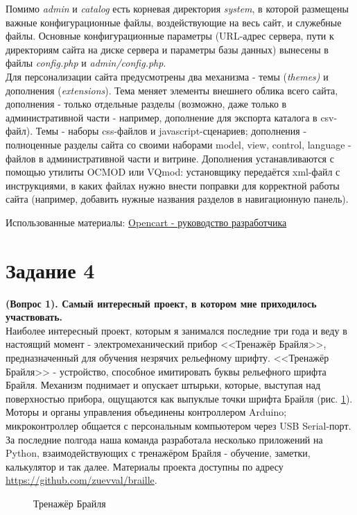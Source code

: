 \documentclass[a4paper,12pt]{article} %
\begin{document}
Помимо \textit{admin} и \textit{catalog} есть корневая директория \textit{system}, в которой размещены важные конфигурационные файлы, воздействующие на весь сайт, и служебные файлы. Основные конфигурационные параметры (URL-адрес сервера, пути к директориям сайта на диске сервера и параметры базы данных) вынесены в файлы \textit{config.php} и \textit{admin/config.php}.\\
Для персонализации сайта предусмотрены два механизма - темы (\textit{themes)} и дополнения (\textit{extensions}). Тема меняет элементы внешнего облика всего сайта, дополнения - только отдельные разделы (возможно, даже только в административной части - например, дополнение для экспорта каталога в csv-файл). Темы - наборы css-файлов и javascript-сценариев; дополнения - полноценные разделы сайта со своими наборами model, view, control, language - файлов в административной части и витрине. Дополнения устанавливаются с помощью утилиты OCMOD или VQmod: установщику передаётся xml-файл с инструкциями, в каких файлах нужно внести поправки для корректной работы  сайта (например, добавить нужные названия разделов в навигационную панель).

\begin{flushright}
	Использованные материалы: \href{https://docs.ocstore.com/index.php?title=%D0%A0%D1%83%D0%BA%D0%BE%D0%B2%D0%BE%D0%B4%D1%81%D1%82%D0%B2%D0%BE_%D0%A0%D0%B0%D0%B7%D1%80%D0%B0%D0%B1%D0%BE%D1%82%D1%87%D0%B8%D0%BA%D0%B0}{Opencart - руководство разработчика}
\end{flushright}
		

\section{Задание 4}
\textbf{(Вопрос 1). Самый интересный проект, в котором мне приходилось участвовать.}\\
Наиболее интересный проект, которым я занимался последние три года и веду в настоящий момент - электромеханический прибор <<Тренажёр Брайля>>, предназначенный для обучения незрячих рельефному шрифту. <<Тренажёр Брайля>> - устройство, способное имитировать буквы рельефного шрифта Брайля. Механизм поднимает и опускает штырьки, которые, выступая над поверхностью прибора, ощущаются как выпуклые точки шрифта Брайля (рис. \ref{braille}). Моторы и органы управления объединены контроллером Arduino; микроконтроллер общается с персональным компьютером через USB Serial-порт.\\
За последние полгода наша команда разработала несколько приложений на Python, взаимодействующих с тренажёром Брайля - обучение, заметки, калькулятор и так далее. Материалы проекта доступны по адресу \url{https://github.com/zuevval/braille}.\\
\begin{figure}[H]
	\caption{Тренажёр Брайля}
	\label{braille}
\end{figure}
\end{document}

